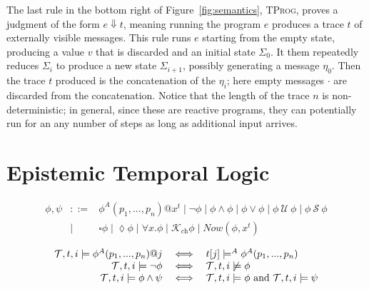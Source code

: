 \documentclass{sig-alternate}
\theoremstyle{definition}
\newcommand{\sch}{\textit{ch}}
\newcommand{\sreduce}{\Downarrow}
\newcommand{\tvar}{x^t}
\newcommand{\atom}{\phi^A}
\newcommand{\tr}{t}
\newcommand{\tset}{\mathcal{T}}
\newcommand{\talways}{\square}
\newcommand{\tevent}{\lozenge}
\newcommand{\tuntil}{~\mathcal{U}~}
\newcommand{\tsince}{~\mathcal{S}~}
\newcommand{\tknows}[1]{\mathcal{K}_{#1}}
\begin{document}
{The last rule in the bottom right of Figure~\ref{fig:semantics},
\textsc{TProg}, proves a judgment of the form $e \sreduce t$, meaning
running the program $e$ produces a trace $t$ of externally visible
messages. This rule runs $e$ starting from the empty state, producing
a value $v$ that is discarded and an initial state $\Sigma_0$. It them
repeatedly reduces $\Sigma_i$ to produce a new state $\Sigma_{i+1}$,
possibly generating a message $\eta_0$. Then the trace $t$ produced is
the concatenation of the $\eta_i$; here empty messages $\cdot$ are
discarded from the concatenation. Notice that the length of the trace
$n$ is non-deterministic; in general, since these are reactive
programs, they can potentially run for an any number of steps as long
as additional input arrives.

\section{Epistemic Temporal Logic}

\begin{figure*}[t]
  \begin{displaymath}
    \begin{array}{rcl}
      \phi, \psi & ::= &
      \atom ( p_1 , ..., p_n ) @ \tvar
      \mid \neg \phi
      \mid \phi \wedge \phi
      \mid \phi \vee \phi
      \mid \phi \tuntil \phi
      \mid \phi \tsince \phi \\
      & \mid & \talways \phi
      \mid \tevent \phi
      \mid \forall x . \phi
      \mid \tknows{\sch} \phi
      \mid Now(\phi,\tvar)
    \end{array}
  \end{displaymath}

  \begin{displaymath}
    \begin{array}{rcl}
      \tset, \tr, i \models \atom ( p_1 , ..., p_n ) @ j & \iff &
      \tr[j] \models^A \atom ( p_1 , ..., p_n )  \\

      \tset, \tr, i \models \neg \phi & \iff &
      \tset, \tr, i  \not \models \phi \\

      \tset, \tr, i  \models \phi \land \psi & \iff &
      \tset, \tr, i  \models \phi \hbox{ and } \tset, \tr, i  \models \psi \\


\end{array}
\end{displaymath}
\end{figure*}}
\end{document}
